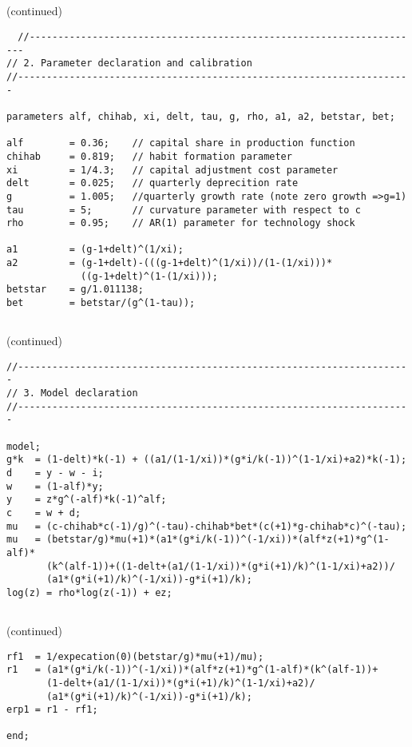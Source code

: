 \documentclass{beamer}
\begin{document}
\subsection[]{}
\begin{slide}{(continued)}
{\tiny\begin{verbatim}
  //---------------------------------------------------------------------
// 2. Parameter declaration and calibration
//---------------------------------------------------------------------

parameters alf, chihab, xi, delt, tau, g, rho, a1, a2, betstar, bet;

alf        = 0.36;    // capital share in production function
chihab     = 0.819;   // habit formation parameter
xi         = 1/4.3;   // capital adjustment cost parameter
delt       = 0.025;   // quarterly deprecition rate
g          = 1.005;   //quarterly growth rate (note zero growth =>g=1)
tau        = 5;       // curvature parameter with respect to c
rho        = 0.95;    // AR(1) parameter for technology shock

a1         = (g-1+delt)^(1/xi);             
a2         = (g-1+delt)-(((g-1+delt)^(1/xi))/(1-(1/xi)))*
             ((g-1+delt)^(1-(1/xi))); 
betstar    = g/1.011138;
bet        = betstar/(g^(1-tau));             
\end{verbatim}
}
\end{slide}

\subsection[]{}
\begin{slide}{(continued)}
{\tiny\begin{verbatim}
//---------------------------------------------------------------------
// 3. Model declaration
//---------------------------------------------------------------------

model;  
g*k  = (1-delt)*k(-1) + ((a1/(1-1/xi))*(g*i/k(-1))^(1-1/xi)+a2)*k(-1);
d    = y - w - i; 
w    = (1-alf)*y;
y    = z*g^(-alf)*k(-1)^alf;
c    = w + d; 
mu   = (c-chihab*c(-1)/g)^(-tau)-chihab*bet*(c(+1)*g-chihab*c)^(-tau);
mu   = (betstar/g)*mu(+1)*(a1*(g*i/k(-1))^(-1/xi))*(alf*z(+1)*g^(1-alf)*
       (k^(alf-1))+((1-delt+(a1/(1-1/xi))*(g*i(+1)/k)^(1-1/xi)+a2))/
       (a1*(g*i(+1)/k)^(-1/xi))-g*i(+1)/k);
log(z) = rho*log(z(-1)) + ez;
\end{verbatim}
}
\end{slide}

\subsection[]{}
\begin{slide}{(continued)}
{\tiny\begin{verbatim}
rf1  = 1/expecation(0)(betstar/g)*mu(+1)/mu);
r1   = (a1*(g*i/k(-1))^(-1/xi))*(alf*z(+1)*g^(1-alf)*(k^(alf-1))+
       (1-delt+(a1/(1-1/xi))*(g*i(+1)/k)^(1-1/xi)+a2)/
       (a1*(g*i(+1)/k)^(-1/xi))-g*i(+1)/k);
erp1 = r1 - rf1;

end;
\end{verbatim}
}
\end{slide}
\end{document}
